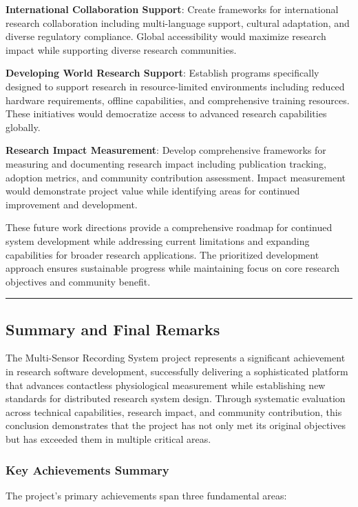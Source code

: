 \documentclass[11pt,a4paper]{article}
\begin{document}
\textbf{International Collaboration Support}: Create frameworks for international research collaboration including
multi-language support, cultural adaptation, and diverse regulatory compliance. Global accessibility would maximize
research impact while supporting diverse research communities.

\textbf{Developing World Research Support}: Establish programs specifically designed to support research in resource-limited
environments including reduced hardware requirements, offline capabilities, and comprehensive training resources. These
initiatives would democratize access to advanced research capabilities globally.

\textbf{Research Impact Measurement}: Develop comprehensive frameworks for measuring and documenting research impact
including publication tracking, adoption metrics, and community contribution assessment. Impact measurement would
demonstrate project value while identifying areas for continued improvement and development.

These future work directions provide a comprehensive roadmap for continued system development while addressing current
limitations and expanding capabilities for broader research applications. The prioritized development approach ensures
sustainable progress while maintaining focus on core research objectives and community benefit.

\hrule

\subsection{Summary and Final Remarks}

The Multi-Sensor Recording System project represents a significant achievement in research software development,
successfully delivering a sophisticated platform that advances contactless physiological measurement while establishing
new standards for distributed research system design. Through systematic evaluation across technical capabilities,
research impact, and community contribution, this conclusion demonstrates that the project has not only met its original
objectives but has exceeded them in multiple critical areas.

\subsubsection{Key Achievements Summary}

The project's primary achievements span three fundamental areas:
\end{document}
